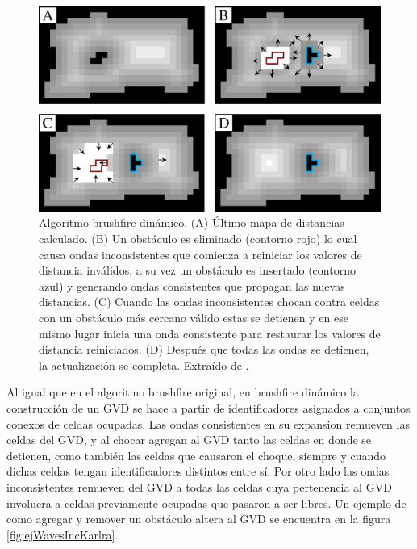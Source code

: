 \begin{figure}[H]
  \center
  \includegraphics[width=1\linewidth]{imagenes/wavesBrushDinClean2Rows.png}
  \caption[Algoritmo brushfire dinámico.]{Algoritmo brushfire dinámico. (A) Último mapa de distancias calculado. (B) Un obstáculo es eliminado (contorno rojo) lo cual causa ondas inconsistentes que comienza a reiniciar los valores de distancia inválidos, a su vez un obstáculo es insertado (contorno azul) y generando ondas consistentes que propagan las nuevas distancias. (C) Cuando las ondas inconsistentes chocan contra celdas con un obstáculo más cercano válido estas se detienen y en ese mismo lugar inicia una onda consistente para restaurar los valores de distancia reiniciados. (D) Después que todas las ondas se detienen, la actualización se completa. Extraído de \cite{Lau2013}.}\label{fig:wavesBrushDyn}
\end{figure} 

Al igual que en el algoritmo brushfire original, en brushfire dinámico la
construcción de un GVD se hace a partir de identificadores asignados a
conjuntos conexos de celdas ocupadas.
Las ondas consistentes en su expansion remueven las celdas del GVD, y al
chocar agregan al GVD tanto las celdas en donde se detienen, como también
las celdas que causaron el choque, siempre y cuando dichas celdas tengan
identificadores distintos entre sí. Por otro lado las ondas inconsistentes remueven del
GVD a todas las celdas cuya pertenencia al GVD involucra a celdas previamente
ocupadas que pasaron a ser libres. Un ejemplo de como agregar y remover un
obstáculo altera al GVD se encuentra en la figura \ref{fig:ejWavesIncKarlra}. 

